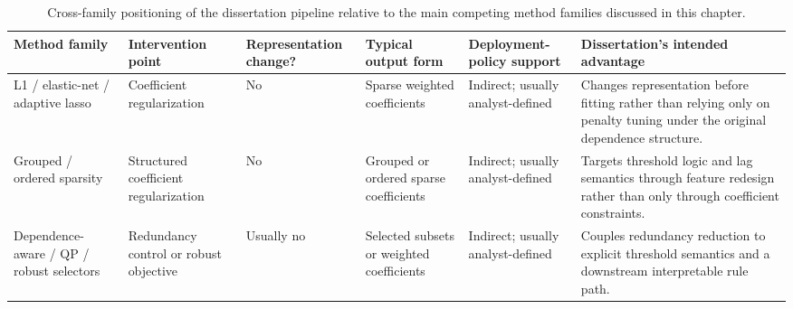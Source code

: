 \begin{table}[p]
    \caption[Cross-family positioning of the dissertation pipeline.]{Cross-family positioning of the dissertation pipeline relative to the main competing method families discussed in this chapter.}
    \label{tab:method_family_positioning}
    \centering
    \setlength{\tabcolsep}{2pt}
    \renewcommand{\arraystretch}{0.95}
    \begin{tabularx}{0.98\textwidth}{>{\RaggedRight\arraybackslash}p{}>{\RaggedRight\arraybackslash}p{}>{\RaggedRight\arraybackslash}p{}>{\RaggedRight\arraybackslash}p{}>{\RaggedRight\arraybackslash}p{}>{\RaggedRight\arraybackslash}X}
        Method family & Intervention point & Representation change? & Typical output form & Deployment-policy support & Dissertation's intended advantage \\ \hline
        L1 / elastic-net / adaptive lasso & Coefficient regularization & No & Sparse weighted coefficients & Indirect; usually analyst-defined & Changes representation before fitting rather than relying only on penalty tuning under the original dependence structure. \\ \hline
        Grouped / ordered sparsity & Structured coefficient regularization & No & Grouped or ordered sparse coefficients & Indirect; usually analyst-defined & Targets threshold logic and lag semantics through feature redesign rather than only through coefficient constraints. \\ \hline
        Dependence-aware / QP / robust selectors & Redundancy control or robust objective & Usually no & Selected subsets or weighted coefficients & Indirect; usually analyst-defined & Couples redundancy reduction to explicit threshold semantics and a downstream interpretable rule path. \\ \hline
    \end{tabularx}
\end{table}

